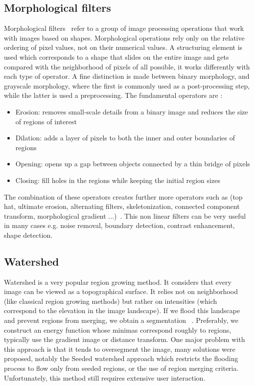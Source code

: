 \documentclass[main.tex]{subfiles}
\begin{document}
\subsection{Morphological filters} 
Morphological filters~\cite{Maragos1986, Breen2000} refer to a group of image processing operations that work with images based on shapes. Morphological operations rely only on the relative ordering of pixel values, not on their numerical values. A structuring element is used which corresponds to a shape that slides on the entire image and gets compared with the neighborhood of pixels of all possible, it works differently with each type of operator. A fine distinction is made between binary morphology, and grayscale morphology, where the first is commonly used as a post-processing step, while the latter is used a preprocessing. The fundamental operators are :
\begin{itemize}
    \item Erosion: removes small-scale details from a binary image and reduces the size of regions of interest
    \item Dilation: adds a layer of pixels to both the inner and outer boundaries of regions
    \item Opening: opens up a gap between objects connected by a thin bridge of pixels
    \item Closing: fill holes in the regions while keeping the initial region sizes
\end{itemize}
The combination of these operators creates further more operators such as (top hat, ultimate erosion, alternating filters, skeletonization, connected component transform, morphological gradient ...)~\cite{Maragos1986, Breen2000}. This non linear filters can be very useful in many cases e.g. noise removal, boundary detection, contrast enhancement, shape detection. 

\subsection{Watershed}
Watershed is a very popular region growing method. It considers that every image can be viewed as a topographical surface. It relies not on neighborhood (like classical region growing methods) but rather on intensities (which correspond to the elevation in the image landscape). If we flood this landscape and prevent regions from merging, we obtain a segmentation ~\cite{Bengtsson2004}. Preferably, we construct an energy function whose minimas correspond roughly to regions, typically use the gradient image or distance transform. One major problem with this approach is that it tends to oversegment the image, many solutions were proposed, notably the Seeded watershed approach which restricts the flooding process to flow only from seeded regions, or the use of region merging criteria. Unfortunately, this method still requires extensive user interaction.
\end{document}
